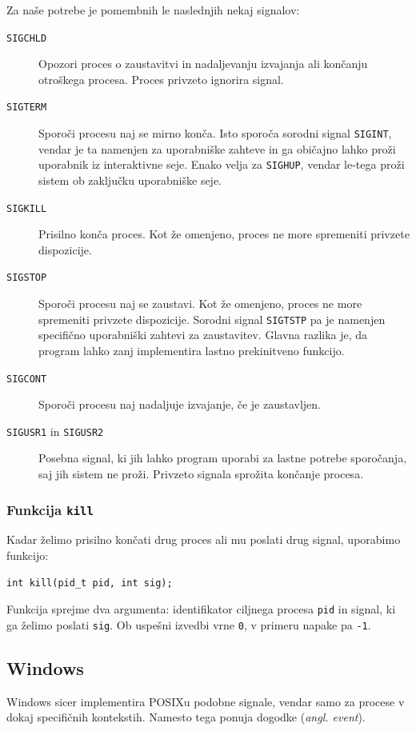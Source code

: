 \documentclass[a4paper,12pt,openright]{book}
\begin{document}
Za naše potrebe je pomembnih le naslednjih nekaj signalov:
\begin{description}
	\item [\texttt{SIGCHLD}] Opozori proces o zaustavitvi in nadaljevanju izvajanja ali končanju otroškega procesa. Proces privzeto ignorira signal.
	\item [\texttt{SIGTERM}] Sporoči procesu naj se mirno konča.
	Isto sporoča sorodni signal \texttt{SIGINT}, vendar je ta namenjen za uporabniške zahteve in ga običajno lahko proži uporabnik iz interaktivne seje.
	Enako velja za \texttt{SIGHUP}, vendar le-tega proži sistem ob zaključku uporabniške seje.
	\item [\texttt{SIGKILL}] Prisilno konča proces. Kot že omenjeno, proces ne more spremeniti privzete dispozicije.
	\item [\texttt{SIGSTOP}] Sporoči procesu naj se zaustavi. Kot že omenjeno, proces ne more spremeniti privzete dispozicije.
	Sorodni signal \texttt{SIGTSTP} pa je namenjen specifično uporabniški zahtevi za zaustavitev. Glavna razlika je, da program lahko zanj implementira lastno prekinitveno funkcijo.
	\item [\texttt{SIGCONT}] Sporoči procesu naj nadaljuje izvajanje, če je zaustavljen.
	\item [\texttt{SIGUSR1} in \texttt{SIGUSR2}] Posebna signal, ki jih lahko program uporabi za lastne potrebe sporočanja, saj jih sistem ne proži.
	Privzeto signala sprožita končanje procesa.
\end{description}

\subsubsection{Funkcija \texttt{kill}}

Kadar želimo prisilno končati drug proces ali mu poslati drug signal, uporabimo funkcijo:
\begin{lstlisting}[style=func]
 int kill(pid_t pid, int sig);
\end{lstlisting}

Funkcija sprejme dva argumenta: identifikator ciljnega procesa \texttt{pid} in signal, ki ga želimo poslati \texttt{sig}.
Ob uspešni izvedbi vrne \texttt{0}, v primeru napake pa \texttt{-1}.

\subsection{Windows}

Windows sicer implementira POSIXu podobne signale, vendar samo za procese v dokaj specifičnih kontekstih.
Namesto tega ponuja dogodke (\textit{angl. event}).
\end{document}
